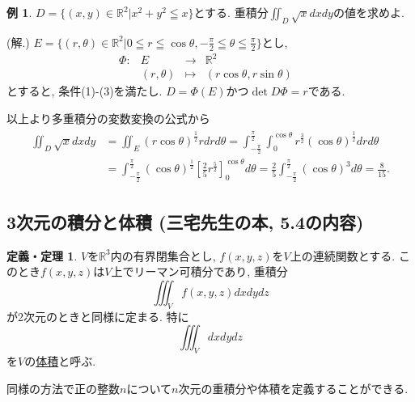 \documentclass[dvipdfmx,a4paper,11pt]{article}
\newcommand{\R}{\mathbb{R}}
\theoremstyle{definition}
\newtheorem{exa}[thm]{例}
\newtheorem{dfnthm}[thm]{定義・定理}
\begin{document}
\begin{exa}
$D=\{ (x,y) \in \R^2 | x^2 + y^2 \leqq x\}$とする.
重積分$\iint_{D} \sqrt{x}dxdy$の値を求めよ.

\hspace{-11pt}(解.) $E= \{ (r ,\theta) \in \R^2  | 0 \leqq r \leqq \cos \theta, 
 -\frac{\pi}{2}\leqq \theta  \leqq\frac{\pi}{2}\}$とし, 
 $$
\begin{array}{ccccc}
\Phi: &E & \rightarrow & \R^2 & \\
&(r,\theta) & \longmapsto & (r \cos \theta , r \sin \theta)&
\end{array}
$$
とすると, 条件(1)-(3)を満たし. $D = \Phi(E)$かつ$\det D\Phi =r$である.

以上より多重積分の変数変換の公式から
\begin{align*}
\begin{split}
\iint_{D} \sqrt{x}dxdy
&=
\iint_{E}  (r\cos \theta)^{\frac{1}{2}} rdrd\theta 
= \int_{- \frac{\pi}{2}}^{\frac{\pi}{2}} 
 \int_{0}^{\cos \theta} r^{\frac{3}{2}} (\cos \theta)^{\frac{1}{2}} drd\theta \\
&=
\int_{- \frac{\pi}{2}}^{\frac{\pi}{2}} (\cos \theta)^{\frac{1}{2}} 
 \left[ \frac{2}{5}r^{\frac{5}{2}} \right]_{0}^{\cos \theta} d\theta 
=\frac{2}{5} \int_{- \frac{\pi}{2}}^{\frac{\pi}{2}} (\cos \theta)^{3} d\theta 
=\frac{8}{15}.
    \end{split}
  \end{align*}
\end{exa}


\subsection{3次元の積分と体積 (三宅先生の本, 5.4の内容)}
\label{2_4}
 \begin{tcolorbox}[
    colback = white,
    colframe = green!35!black,
    fonttitle = \bfseries,
    breakable = true]
\begin{dfnthm}
$V$を$\R^3$内の有界閉集合とし, $f(x,y,z)$を$V$上の連続関数とする.
このとき$f(x,y,z)$は$V$上でリーマン可積分であり, 重積分
$$
\iiint_{V}f(x,y,z) dxdydz
$$
が2次元のときと同様に定まる. 
特に
$$
\iiint_{V}dxdydz
$$
を$V$の\underline{体積}と呼ぶ.
\end{dfnthm}
\end{tcolorbox}
同様の方法で正の整数$n$について$n$次元の重積分や体積を定義することができる.
 
\end{document}
